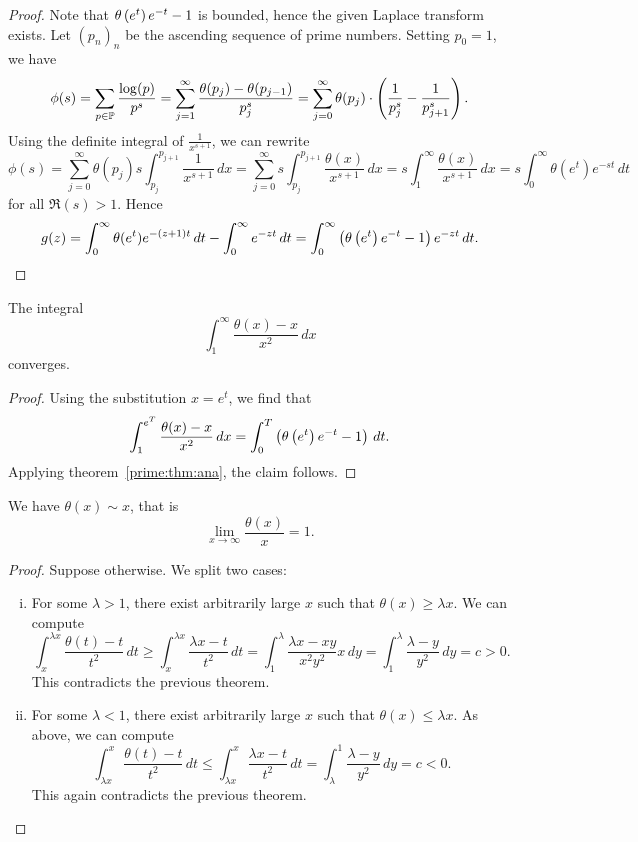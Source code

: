 \begin{proof}
Note that $\theta \left(e^t\right) e^{-t} - 1$ is bounded, hence the
given Laplace transform exists. Let $(p_n)_n$ be the ascending
sequence of prime numbers. Setting $p_0 = 1$, we have
\[
\phi(s) =
\sum_{p \in \mathbb{P}} \frac{\log(p)}{p^s} =
\sum_{j=1}^\infty \frac{\theta(p_j) - \theta(p_{j-1})}{p_j^s} =
\sum_{j=0}^\infty \theta(p_j) \cdot
\left(\frac{1}{p_j^s} - \frac{1}{p_{j+1}^s}\right).
\]
Using the definite integral of $\frac{1}{x^{s+1}}$, we can rewrite
\[
\phi(s) =
\sum_{j=0}^\infty \theta(p_j) s
\int_{p_j}^{p_{j+1}} \frac{1}{x^{s+1}}\,dx =
\sum_{j=0}^\infty s
\int_{p_j}^{p_{j+1}} \frac{\theta(x)}{x^{s+1}}\,dx =
s \int_1^\infty \frac{\theta(x)}{x^{s+1}}\,dx =
s \int_0^\infty \theta(e^t) e^{-st}\,dt
\]
for all $\Re(s) > 1$. Hence
\[
g(z) =
\int_0^\infty \theta(e^t) e^{-(z+1)t}\,dt -
\int_0^\infty e^{-zt}\,dt =
\int_0^\infty \left(\theta \left(e^t\right) e^{-t} - 1\right) e^{-zt}\,dt. \qedhere
\]
\end{proof}

\begin{izrek}
The integral
\[
\int_1^\infty \frac{\theta(x) - x}{x^2}\,dx
\]
converges.
\end{izrek}

\begin{proof}
Using the substitution $x = e^t$, we find that
\[
\int_1^{e^T} \frac{\theta(x) - x}{x^2}\,dx =
\int_0^T \left(\theta \left(e^t\right) e^{-t} - 1\right)\,dt.
\]
Applying theorem~\ref{prime:thm:ana}, the claim follows.
\end{proof}

\begin{izrek}
We have $\theta(x) \sim x$, that is
\[
\lim_{x \to \infty} \frac{\theta(x)}{x} = 1.
\]
\end{izrek}

\begin{proof}
Suppose otherwise. We split two cases:

\begin{enumerate}[i)]
\item For some $\lambda > 1$, there exist arbitrarily large $x$
such that $\theta(x) \geq \lambda x$. We can compute
\[
\int_x^{\lambda x} \frac{\theta(t) - t}{t^2}\,dt \geq
\int_x^{\lambda x} \frac{\lambda x - t}{t^2}\,dt =
\int_1^\lambda \frac{\lambda x - xy}{x^2 y^2} x\,dy =
\int_1^\lambda \frac{\lambda - y}{y^2}\,dy =
c >
0.
\]
This contradicts the previous theorem.
\item For some $\lambda < 1$, there exist arbitrarily large $x$
such that $\theta(x) \leq \lambda x$. As above, we can compute
\[
\int_{\lambda x}^x \frac{\theta(t) - t}{t^2}\,dt \leq
\int_{\lambda x}^x \frac{\lambda x - t}{t^2}\,dt =
\int_\lambda^1 \frac{\lambda - y}{y^2}\,dy =
c <
0.
\]
This again contradicts the previous theorem. \qedhere
\end{enumerate}
\end{proof}

